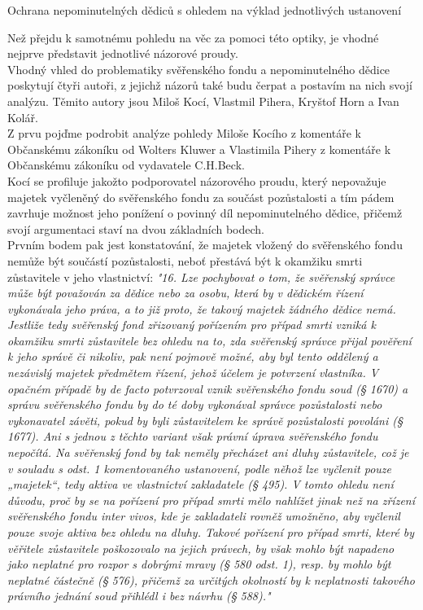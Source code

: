 \documentclass{article}
\begin{document}
   \begin{enumerate}
 {\Large\item[1.] Ochrana nepominutelných dědiců s ohledem na výklad jednotlivých ustanovení}
 \end{enumerate}
 
 Než přejdu k samotnému pohledu na věc za pomoci této optiky, je vhodné nejprve představit jednotlivé názorové proudy.\\
 
 Vhodný vhled do problematiky svěřenského fondu a nepominutelného dědice poskytují čtyři autoři, z jejichž názorů také budu čerpat a postavím na nich svojí analýzu. Těmito autory jsou Miloš Kocí, Vlastmil Pihera, Kryštof Horn a Ivan Kolář.\\
 
 Z prvu pojďme podrobit analýze pohledy Miloše Kocího z komentáře k Občanskému zákoníku od Wolters Kluwer a Vlastimila Pihery z komentáře k Občanskému zákoníku od vydavatele C.H.Beck.\\
 
 Kocí se profiluje jakožto podporovatel názorového proudu, který nepovažuje majetek vyčleněný do svěřenského fondu za součást pozůstalosti a tím pádem zavrhuje možnost jeho ponížení o povinný díl nepominutelného dědice, přičemž svojí argumentaci staví na dvou základních bodech.\\
 
 Prvním bodem pak jest konstatování, že majetek vložený do svěřenského fondu nemůže být součástí pozůstalosti, neboť přestává být k okamžiku smrti zůstavitele v jeho vlastnictví: \textit{"16. Lze pochybovat o tom, že svěřenský správce může být považován za dědice nebo za osobu, která by v dědickém řízení vykonávala jeho práva, a to již proto, že takový majetek žádného dědice nemá. Jestliže tedy svěřenský fond zřizovaný pořízením pro případ smrti vzniká k okamžiku smrti zůstavitele bez ohledu na to, zda svěřenský správce přijal pověření k jeho správě či nikoliv, pak není pojmově možné, aby byl tento oddělený a nezávislý majetek předmětem řízení, jehož účelem je potvrzení vlastníka. V opačném případě by de facto potvrzoval vznik svěřenského fondu soud (§ 1670) a správu svěřenského fondu by do té doby vykonával správce pozůstalosti nebo vykonavatel závěti, pokud by byli zůstavitelem ke správě pozůstalosti povoláni (§ 1677). Ani s jednou z těchto variant však právní úprava svěřenského fondu nepočítá. Na svěřenský fond by tak neměly přecházet ani dluhy zůstavitele, což je v souladu s odst. 1 komentovaného ustanovení, podle něhož lze vyčlenit pouze „majetek“, tedy aktiva ve vlastnictví zakladatele (§ 495). V tomto ohledu není důvodu, proč by se na pořízení pro případ smrti mělo nahlížet jinak než na zřízení svěřenského fondu inter vivos, kde je zakladateli rovněž umožněno, aby vyčlenil pouze svoje aktiva bez ohledu na dluhy. Takové pořízení pro případ smrti, které by věřitele zůstavitele poškozovalo na jejich právech, by však mohlo být napadeno jako neplatné pro rozpor s dobrými mravy (§ 580 odst. 1), resp. by mohlo být neplatné částečně (§ 576), přičemž za určitých okolností by k neplatnosti takového právního jednání soud přihlédl i bez návrhu (§ 588)."}\\
 
\end{document}
